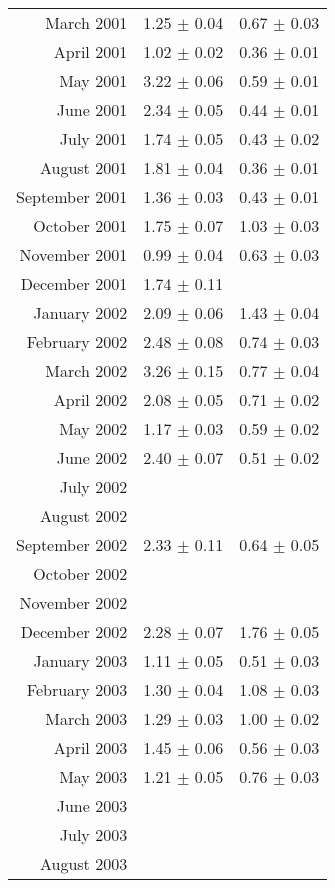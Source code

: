 \documentclass[a4paper,12pt]{article}
\begin{document}
\begin{center}
\begin{longtable}{|r|c|c|}
    March	2001	&	1.25	$\pm$	0.04	&	0.67	$\pm$	0.03	\\
    April	2001	&	1.02	$\pm$	0.02	&	0.36	$\pm$	0.01	\\
    May		2001	&	3.22	$\pm$	0.06	&	0.59	$\pm$	0.01	\\
    June	2001	&	2.34	$\pm$	0.05	&	0.44	$\pm$	0.01	\\
    July	2001	&	1.74	$\pm$	0.05	&	0.43	$\pm$	0.02	\\
    August	2001	&	1.81	$\pm$	0.04	&	0.36	$\pm$	0.01	\\
    September	2001	&	1.36	$\pm$	0.03	&	0.43	$\pm$	0.01	\\
    October	2001	&	1.75	$\pm$	0.07	&	1.03	$\pm$	0.03	\\
    November	2001	&	0.99	$\pm$	0.04	&	0.63	$\pm$	0.03	\\
    December	2001	&	1.74	$\pm$	0.11	&				\\
    January	2002	&	2.09	$\pm$	0.06	&	1.43	$\pm$	0.04	\\
    February	2002	&	2.48	$\pm$	0.08	&	0.74	$\pm$	0.03	\\
    March	2002	&	3.26	$\pm$	0.15	&	0.77	$\pm$	0.04	\\
    April	2002	&	2.08	$\pm$	0.05	&	0.71	$\pm$	0.02	\\
    May		2002	&	1.17	$\pm$	0.03	&	0.59	$\pm$	0.02	\\
    June	2002	&	2.40	$\pm$	0.07	&	0.51	$\pm$	0.02	\\
    July	2002	&				&				\\
    August	2002	&				&				\\
    September	2002	&	2.33	$\pm$	0.11	&	0.64	$\pm$	0.05	\\
    October	2002	&				&				\\
    November	2002	&				&				\\
    December	2002	&	2.28	$\pm$	0.07	&	1.76	$\pm$	0.05	\\
    January	2003	&	1.11	$\pm$	0.05	&	0.51	$\pm$	0.03	\\
    February	2003	&	1.30	$\pm$	0.04	&	1.08	$\pm$	0.03	\\
    March	2003	&	1.29	$\pm$	0.03	&	1.00	$\pm$	0.02	\\
    April	2003	&	1.45	$\pm$	0.06	&	0.56	$\pm$	0.03	\\
    May		2003	&	1.21	$\pm$	0.05	&	0.76	$\pm$	0.03	\\
    June	2003	&				&				\\
    July	2003	&				&				\\
    August	2003	&				&				\\

\end{longtable}
\end{center}
\end{document}
